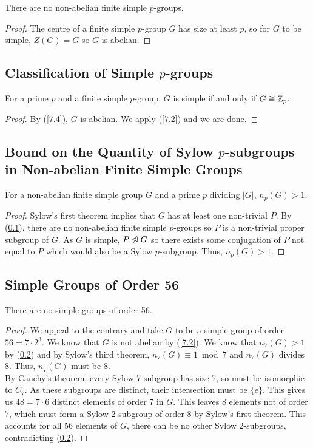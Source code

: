 There are no non-abelian finite simple $p$-groups.

\begin{proof}
    The centre of a finite simple $p$-group $G$ has
    size at least $p$, so for $G$ to be simple, $Z(G) = G$
    so $G$ is abelian.
\end{proof}

\subsection{Classification of Simple $p$-groups} \label{7.5}

For a prime $p$ and a finite simple $p$-group, $G$ is simple
if and only if $G \cong \mathbb{Z}_p$.

\begin{proof}
    By (\ref{7.4}), $G$ is abelian. We apply (\ref{7.2}) and
    we are done.
\end{proof}

\subsection{Bound on the Quantity of Sylow $p$-subgroups 
in Non-abelian Finite Simple Groups} \label{7.6}

For a non-abelian finite simple group $G$ and a prime
$p$ dividing $|G|$, $n_p(G) > 1$.

\begin{proof}
    Sylow's first theorem implies that $G$ has at least one
    non-trivial \Syls $P$. By (\ref{7.5}), there are no
    non-abelian finite simple $p$-groups so $P$ is a
    non-trivial proper subgroup of $G$.
    As $G$ is simple, $P \not\trianglelefteq G$ so there exists
    some conjugation of $P$ not equal to $P$ which would
    also be a Sylow $p$-subgroup.
    Thus, $n_p(G) > 1$. 
\end{proof}

\subsection{Simple Groups of Order 56} \label{7.7}

There are no simple groups of order 56.

\begin{proof}
    We appeal to the contrary and take $G$ to be a simple
    group of order $56 = 7 \cdot 2^3$. We know that $G$
    is not abelian by (\ref{7.2}). We know that $n_7(G) > 1$
    by (\ref{7.6}) and by Sylow's third theorem, 
    $n_7(G) \equiv 1 \bmod 7$ and $n_7(G)$ divides 8.
    Thus, $n_7(G)$ must be 8.
    \\[\baselineskip]
    By Cauchy's theorem, every Sylow 7-subgroup has size 7,
    so must be isomorphic to $C_7$. As these subgroups
    are distinct, their intersection must be $\{e\}$.
    This gives us $48 = 7 \cdot 6$ distinct elements of
    order 7 in $G$. This leaves 8 elements not of order $7$,
    which must form a Sylow 2-subgroup of order $8$ by Sylow's
    first theorem. This accounts for all 56 elements of $G$,
    there can be no other Sylow 2-subgroups, contradicting
    (\ref{7.6}).
\end{proof}

